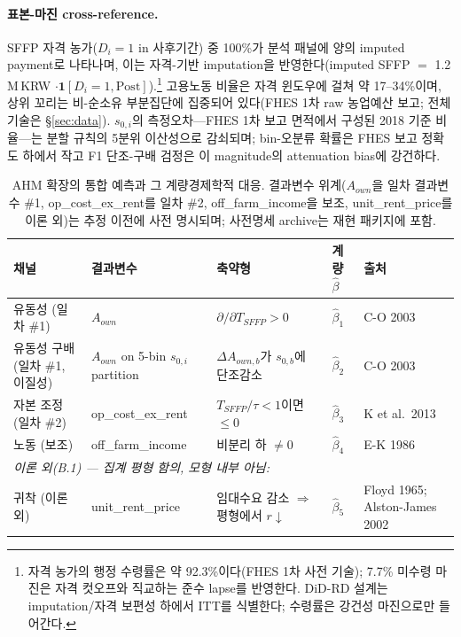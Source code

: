 \documentclass[12pt, a4paper]{article}
\begin{document}
\paragraph{표본-마진 cross-reference.} SFFP 자격 농가($D_i = 1$ in 사후기간) 중 100\%가 분석 패널에 양의 imputed payment로 나타나며, 이는 자격-기반 imputation을 반영한다(imputed SFFP $=$ 1.2\,M\,KRW $\cdot \mathbf{1}[D_i = 1, \text{Post}]$).\footnote{자격 농가의 행정 수령률은 약 92.3\%이다(FHES 1차 사전 기술); 7.7\% 미수령 마진은 자격 컷오프와 직교하는 준수 lapse를 반영한다. DiD-RD 설계는 imputation/자격 보편성 하에서 ITT를 식별한다; 수령률은 강건성 마진으로만 들어간다.} 고용노동 비율은 자격 윈도우에 걸쳐 약 17--34\%이며, 상위 꼬리는 비-순소유 부분집단에 집중되어 있다(FHES 1차 raw 농업예산 보고; 전체 기술은 \S\ref{sec:data}). $s_{0,i}$의 측정오차---FHES 1차 보고 면적에서 구성된 2018 기준 비율---는 분할 규칙의 5분위 이산성으로 감쇠되며; bin-오분류 확률은 FHES 보고 정확도 하에서 작고 F1 단조-구배 검정은 이 magnitude의 attenuation bias에 강건하다.

\begin{table}[ht]
\centering
\caption{AHM 확장의 통합 예측과 그 계량경제학적 대응. 결과변수 위계($A_{own}$을 일차 결과변수 \#1, op\_cost\_ex\_rent를 일차 \#2, off\_farm\_income을 보조, unit\_rent\_price를 이론 외)는 추정 이전에 사전 명시되며; 사전명세 archive는 재현 패키지에 포함.}
\label{tab:alpha3-predictions}
\small
\begin{tabular}{p{2.4cm} p{3.0cm} p{3.4cm} p{1.4cm} p{2.4cm}}
\toprule
채널 & 결과변수 & 축약형 & 계량 $\hat\beta$ & 출처 \\
\midrule
유동성 (일차 \#1) & $A_{own}$ & $\partial/\partial T_{SFFP} > 0$ & $\hat\beta_1$ & C-O 2003 \\
유동성 구배 (일차 \#1, 이질성) & $A_{own}$ on 5-bin $s_{0,i}$ partition & $\Delta A_{own,b}$가 $s_{0,b}$에 단조감소 & $\hat\beta_2$ & C-O 2003 \\
자본 조정 (일차 \#2) & op\_cost\_ex\_rent & $T_{SFFP}/\tau < 1$이면 $\le 0$ & $\hat\beta_3$ & K et al.\ 2013 \\
노동 (보조) & off\_farm\_income & 비분리 하 $\ne 0$ & $\hat\beta_4$ & E-K 1986 \\
\midrule
\multicolumn{5}{l}{\textit{이론 외(B.1) --- 집계 평형 함의, 모형 내부 아님:}} \\
귀착 (이론 외) & unit\_rent\_price & 임대수요 감소 $\Rightarrow$ 평형에서 $r \downarrow$ & $\hat\beta_5$ & Floyd 1965; Alston-James 2002 \\
\bottomrule
\end{tabular}
\end{table}
\end{document}
